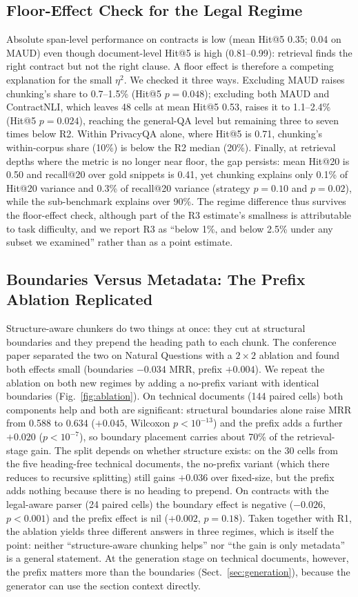 \documentclass[runningheads]{llncs}
\begin{document}
\subsection{Floor-Effect Check for the Legal Regime}
\label{sec:floor}
Absolute span-level performance on contracts is low (mean Hit@5 0.35; 0.04 on MAUD) even though document-level Hit@5 is high (0.81--0.99): retrieval finds the right contract but not the right clause. A floor effect is therefore a competing explanation for the small $\eta^2$. We checked it three ways. Excluding MAUD raises chunking's share to 0.7--1.5\% (Hit@5 $p=0.048$); excluding both MAUD and ContractNLI, which leaves 48 cells at mean Hit@5 0.53, raises it to 1.1--2.4\% (Hit@5 $p=0.024$), reaching the general-QA level but remaining three to seven times below R2. Within PrivacyQA alone, where Hit@5 is 0.71, chunking's within-corpus share (10\%) is below the R2 median (20\%). Finally, at retrieval depths where the metric is no longer near floor, the gap persists: mean Hit@20 is 0.50 and recall@20 over gold snippets is 0.41, yet chunking explains only 0.1\% of Hit@20 variance and 0.3\% of recall@20 variance (strategy $p=0.10$ and $p=0.02$), while the sub-benchmark explains over 90\%. The regime difference thus survives the floor-effect check, although part of the R3 estimate's smallness is attributable to task difficulty, and we report R3 as ``below 1\%, and below 2.5\% under any subset we examined'' rather than as a point estimate.

\subsection{Boundaries Versus Metadata: The Prefix Ablation Replicated}
\label{sec:ablation}
Structure-aware chunkers do two things at once: they cut at structural boundaries and they prepend the heading path to each chunk. The conference paper separated the two on Natural Questions with a $2\times2$ ablation and found both effects small (boundaries $-0.034$ MRR, prefix $+0.004$). We repeat the ablation on both new regimes by adding a no-prefix variant with identical boundaries (Fig.~\ref{fig:ablation}). On technical documents (144 paired cells) both components help and both are significant: structural boundaries alone raise MRR from 0.588 to 0.634 ($+0.045$, Wilcoxon $p<10^{-13}$) and the prefix adds a further $+0.020$ ($p<10^{-7}$), so boundary placement carries about 70\% of the retrieval-stage gain. The split depends on whether structure exists: on the 30 cells from the five heading-free technical documents, the no-prefix variant (which there reduces to recursive splitting) still gains $+0.036$ over fixed-size, but the prefix adds nothing because there is no heading to prepend. On contracts with the legal-aware parser (24 paired cells) the boundary effect is negative ($-0.026$, $p<0.001$) and the prefix effect is nil ($+0.002$, $p=0.18$). Taken together with R1, the ablation yields three different answers in three regimes, which is itself the point: neither ``structure-aware chunking helps'' nor ``the gain is only metadata'' is a general statement. At the generation stage on technical documents, however, the prefix matters more than the boundaries (Sect.~\ref{sec:generation}), because the generator can use the section context directly.
\end{document}
